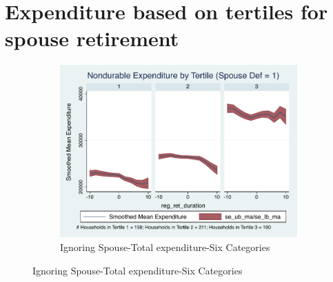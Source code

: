 \documentclass[11pt,onecolumn]{article}
\numberwithin{figure}{section}
\begin{document}
\section{Expenditure based on tertiles for spouse retirement} 
\begin{figure}
\begin{subfigure}{1.0\textwidth}
	\caption{Ignoring Spouse-Total expenditure-Six Categories}
	\centering
	\includegraphics[width=0.8\linewidth]{../ConsumptionPostRetirement_by_SpouseDef/Smoothed/spouse_def_1.pdf}
	\end{subfigure}
	\vspace{1cm}


\end{figure}
\end{document}
